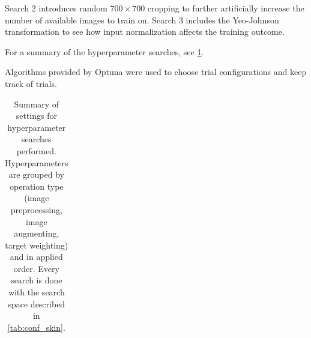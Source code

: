 Search 2 introduces random $700\times700$ cropping to further artificially increase the number of available images to train on.
Search 3 includes the Yeo-Johnson transformation to see how input normalization affects the training outcome.

For a summary of the hyperparameter searches, see \cref{tab:skin_studies}.

Algorithms provided by Optuna  were used to choose trial configurations and keep track of trials.

\begin{table}
    \caption[Skinstression hyperparameter search studies]{
        Summary of settings for hyperparameter searches performed.
        Hyperparameters are grouped by operation type (image preprocessing, image augmenting, target weighting) and in applied order.
        Every search is done with the search space described in \cref{tab:conf_skin}.
    }
    \label{tab:skin_studies}
    \begin{tabular}{lcccc}


\end{tabular}
\end{table}
